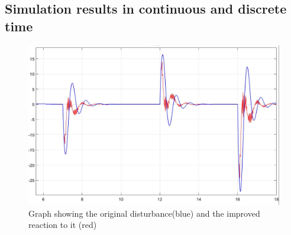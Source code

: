 \subsection{Simulation results in continuous and discrete time}
\label{simulation}

\begin{figure}[H]
\centering
\includegraphics[width=1\textwidth]{rapport/billeder/temporary/improved_output}
\caption{Graph showing the original disturbance(blue) and the improved reaction to it (red)}
\label{fig:dist_out}
\end{figure}


